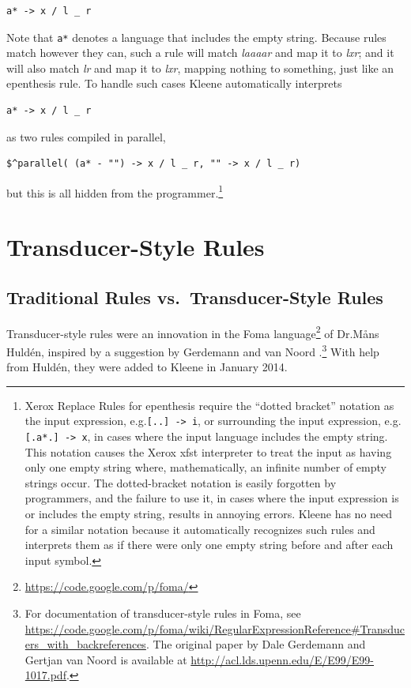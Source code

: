 \begin{Verbatim}
a* -> x / l _ r
\end{Verbatim}

\noindent
Note that \verb!a*! denotes a language that includes the empty string.
Because rules match however they can, such a rule will match \emph{laaaar} and map it to \emph{lxr}; and it will also
match \emph{lr} and map it to \emph{lxr}, mapping nothing to
something, just like an epenthesis rule.  To handle such cases Kleene
automatically interprets 

\begin{Verbatim}
a* -> x / l _ r
\end{Verbatim}

\noindent
as two rules compiled in parallel, 

\begin{Verbatim}
$^parallel( (a* - "") -> x / l _ r, "" -> x / l _ r)
\end{Verbatim}

\noindent
but this is all hidden from the programmer.\footnote{Xerox Replace Rules for epenthesis require the ``dotted bracket'' notation as
the input expression, e.g.\@  \verb![..] -> i!, or surrounding the input expression, e.g.\@ \verb![.a*.] -> x!, in
cases where the input language includes the empty string.  This notation causes the Xerox xfst interpreter to treat
the input as having only one empty string where, mathematically, an infinite number of empty strings occur.  The
dotted-bracket notation is easily forgotten by programmers, and the failure to use it, in cases where the input
expression is or includes the empty string, results in annoying errors.  Kleene
has no need for a similar notation because it automatically recognizes such rules and interprets them as if there
were only one empty string before and after each input symbol.}

\section{Transducer-Style Rules}

\subsection{Traditional Rules vs.\ Transducer-Style Rules}

Transducer-style rules were an innovation in the Foma language\footnote{\url{https://code.google.com/p/foma/}} of 
Dr.\@ M\r{a}ns Huldén, inspired by a suggestion by Gerdemann and van
Noord
\citep{gerdemann+vannoord:1999}.\footnote{For documentation of transducer-style rules in Foma,
	see
\url{https://code.google.com/p/foma/wiki/RegularExpressionReference#Transducers_with_backreferences}.
The original paper by Dale Gerdemann and Gertjan van Noord is available
at \url{http://acl.lds.upenn.edu/E/E99/E99-1017.pdf}.}  With help from 
Huldén, they were added to Kleene in January 2014.

